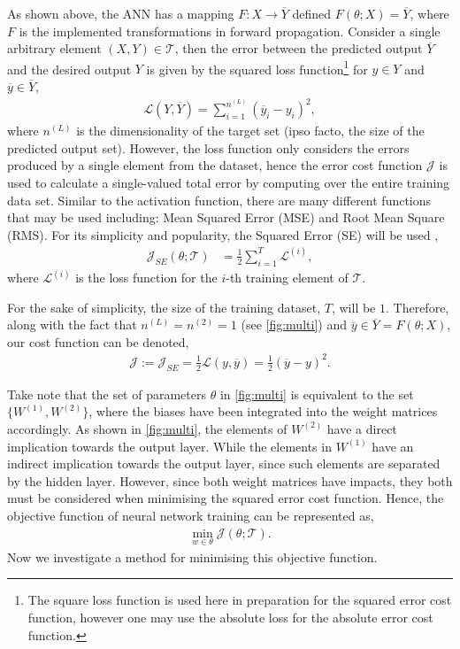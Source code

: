 As shown above, the ANN has a mapping $F:X\rightarrow \overline{Y}$ defined $F(\theta;X)=\overline{Y}$, where $F$ is the implemented transformations in forward propagation. Consider a single arbitrary element $(X,Y)\in\mathcal{T}$, then the error between the predicted output $\overline{Y}$ and the desired output $Y$ is given by the squared loss function\footnote{The square loss function is used here in preparation for the squared error cost function, however one may use the absolute loss for the absolute error cost function. } for $y\in Y$ and $\overline{y} \in\overline{Y}$,
\begin{align*}
    \mathcal{L}(Y,\overline{Y})=\sum_{i=1}^{n^{(L)}} (\overline{y}_{i}-y_i)^2,
\end{align*}
where $n^{(L)}$ is the dimensionality of the target set (ipso facto, the size of the predicted output set). However, the loss function only considers the errors produced by a single element from the dataset, hence the error cost function $\mathcal{J}$ is used to  calculate a single-valued total error by computing over the entire training data set. Similar to the activation function, there are many different functions that may be used including: Mean Squared Error (MSE) and Root Mean Square (RMS). For its simplicity and popularity, the Squared Error (SE) will be used  \parencite[]{taylorbook},
\begin{align}
    \mathcal{J}_{SE}(\theta;\mathcal{T})
    &=\frac{1}{2}\sum_{i=1}^{T} \mathcal{L}^{(i)} 
    \label{eq:squareerror},
\end{align}
where $\mathcal{L}^{(i)}$ is the loss function for the $i$-th training element of $\mathcal{T}$.

For the sake of simplicity, the size of the training dataset, $T$, will be $1$. Therefore, along with the fact that $n^{(L)}=n^{(2)}=1$ (see \autoref{fig:multi}) and $\overline{y}\in \overline{Y}=F(\theta;X)$, 
our cost function can be denoted,
\begin{align}
    \mathcal{J}:=\mathcal{J}_{SE}=\frac{1}{2}\mathcal{L}(y,\overline{y})=\frac{1}{2}(\overline{y}-y)^2 \label{eq:reducedsquareerror}.
\end{align}

Take note that the set of parameters $\theta$ in \autoref{fig:multi} is equivalent to the set $\{W^{(1)},W^{(2)}\}$, where the biases have been integrated into the weight matrices accordingly. As shown in \autoref{fig:multi}, the elements of $W^{(2)}$ have a direct implication towards the output layer. While the elements in $W^{(1)}$ have an indirect implication towards the output layer, since such elements are separated by the hidden layer. However, since both weight matrices have impacts, they both must be considered when minimising the squared error cost function. Hence, the objective function of neural network training can be represented as,
\begin{align*}
    \min_{w\in\theta} \mathcal{J}(\theta;\mathcal{T}).
\end{align*}
Now we investigate a method for minimising this objective function. 

